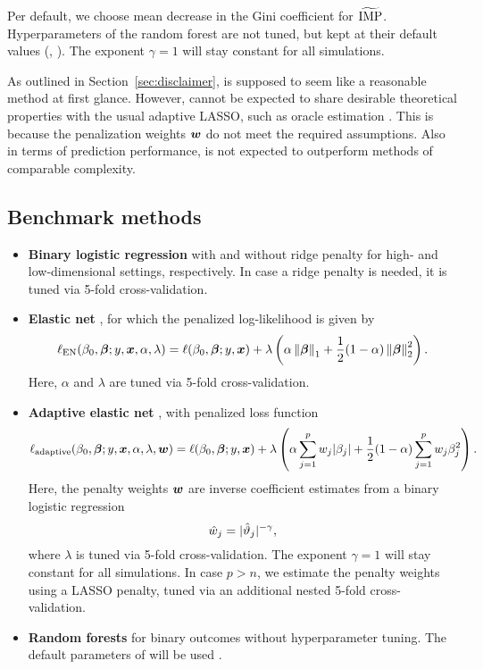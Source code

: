 \documentclass[a4paper, 11pt]{article}\usepackage[]{graphicx}\usepackage[]{color}
\begin{document}
Per default, we choose mean decrease in the Gini coefficient for $\widetilde{\operatorname{IMP}}$.
Hyperparameters of the random forest are not tuned, but kept at their default
values (\eg {}, ). The exponent $\gamma = 1$ will stay
constant for all simulations.

As outlined in Section~\ref{sec:disclaimer}, \ainet{} is supposed to seem like
a reasonable method at first glance. However, \ainet{} cannot be expected to 
share desirable theoretical properties with the usual adaptive LASSO, 
such as oracle estimation \citep{Zou2006}. This is because the penalization
weights $\text{\boldmath$w$}$ do not meet the required assumptions. Also in terms of prediction
performance, \ainet{} is not expected to outperform methods of comparable complexity.

\subsection{Benchmark methods}

\begin{itemize}
   \item \textbf{Binary logistic regression} \citep{mccullagh2019generalized} 
   with and without ridge penalty for high- and
   low-dimensional settings, respectively. In case a ridge penalty is needed,
   it is tuned via 5-fold cross-validation.
   \item \textbf{Elastic net} \citep{Zou2005}, for which the penalized 
   log-likelihood is given by
    $$\ell_{\text{EN}}(\beta_0, \text{\boldmath$\beta$}; y, \text{\boldmath$x$}, \alpha, \lambda) = 
      \ell(\beta_0, \text{\boldmath$\beta$}; y, \text{\boldmath$x$}) + \lambda\left(\alpha \left\lVert\text{\boldmath$\beta$}\right\rVert_1 + \frac{1}{2} (1-\alpha) \left\lVert\text{\boldmath$\beta$}\right\rVert_2^2 \right).$$
    Here, $\alpha$ and $\lambda$ are tuned via 5-fold cross-validation.
   \item \textbf{Adaptive elastic net} \citep{Zou2006}, with penalized loss function
    $$\ell_{\text{adaptive}}(\beta_0, \text{\boldmath$\beta$}; y, \text{\boldmath$x$}, \alpha, \lambda, \text{\boldmath$w$})
    = \ell(\beta_0, \text{\boldmath$\beta$}; y, \text{\boldmath$x$}) + \lambda\left(\alpha \sum_{j = 1}^p{w_j\lvert\beta_j\rvert} + \frac{1}{2} (1-\alpha) \sum_{j=1}^p{w_j\beta_j^2} \right).$$
    Here, the penalty weights $\text{\boldmath$w$}$ are inverse coefficient estimates from a
    binary logistic regression
    $$\hat{w}_j = \lvert\hat{\vartheta}_j\rvert^{-\gamma},$$
    where $\lambda$ is tuned via 5-fold cross-validation.
    The exponent $\gamma = 1$ will stay constant for all simulations.
    In case $p > n$, we estimate the penalty weights using a LASSO penalty, tuned
    via an additional nested 5-fold cross-validation.
    \item \textbf{Random forests} \citep{Breiman2001} for binary outcomes without 
    hyperparameter tuning. The default parameters of  will be used 
    \citep{ranger2017}. %
\end{itemize}
\end{document}
